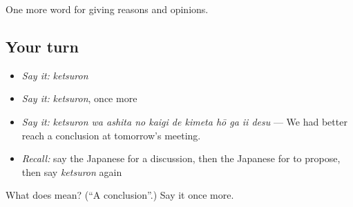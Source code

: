 \begin{grammarlens}[title={What you've built}]
One more word for giving reasons and opinions.
\end{grammarlens}

\subsection*{Your turn}
\begin{itemize}
\raggedright
  \item \emph{Say it:} \emph{ketsuron}
  \item \emph{Say it:} \emph{ketsuron}, once more
  \item \emph{Say it:} \emph{ketsuron wa ashita no kaigi de kimeta hō ga ii desu} — We had better reach a conclusion at tomorrow's meeting.
  \item \emph{Recall:} say the Japanese for a discussion, then the Japanese for to propose, then say \emph{ketsuron} again
\end{itemize}

\begin{tcolorbox}[breakable,colback=teal!4,colframe=teal!35!black,title={Before you move on}]
What does  mean? (\textquotedblleft{}A conclusion\textquotedblright{}.) Say it once more.
\end{tcolorbox}

